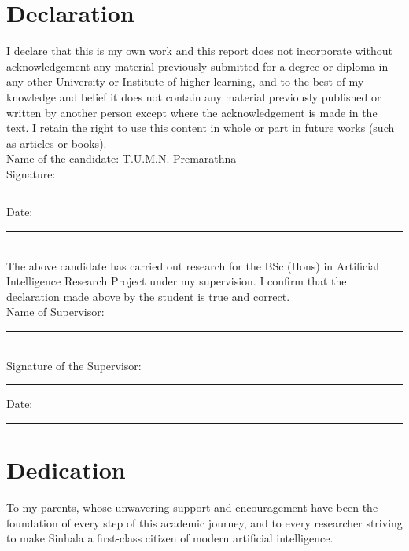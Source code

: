 \documentclass[12pt,a4paper,oneside]{report}
\begin{document}
\chapter*{Declaration}
I declare that this is my own work and this report does not incorporate without acknowledgement any material previously submitted for a degree or diploma in any other University or Institute of higher learning, and to the best of my knowledge and belief it does not contain any material previously published or written by another person except where the acknowledgement is made in the text. I retain the right to use this content in whole or part in future works (such as articles or books).\\[1.5cm]

\noindent
Name of the candidate: T.U.M.N. Premarathna \\[1cm]
Signature: \rule{5cm}{0.4pt} \hfill Date: \rule{4cm}{0.4pt} \\[2cm]

\noindent
The above candidate has carried out research for the BSc (Hons) in Artificial Intelligence Research Project under my supervision. I confirm that the declaration made above by the student is true and correct.\\[1.5cm]

\noindent
Name of Supervisor: \rule{7cm}{0.4pt} \\[1.5cm]
Signature of the Supervisor: \rule{5cm}{0.4pt} \hfill Date: \rule{4cm}{0.4pt} 

\clearpage

\chapter*{Dedication}
To my parents, whose unwavering support and encouragement have been the foundation of every step of this academic journey, and to every researcher striving to make Sinhala a first-class citizen of modern artificial intelligence.

\clearpage

\end{document}
